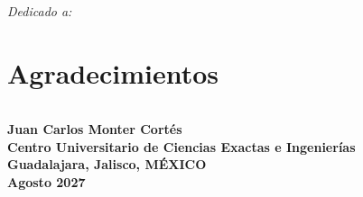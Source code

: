 \documentclass[letterpaper,12pt,oneside]{book}
\begin{document}
\chapter*{}

\vspace*{5cm}
{\Large
\textit{Dedicado a:}\\
\begin{equation*}
  \mbox{ }
\end{equation*}
}
\vspace*{\fill}

\chapter*{Agradecimientos}


\begin{equation*}
\mbox{ }
\end{equation*}

\begin{flushright}
\textbf{Juan Carlos Monter Cortés\\
Centro Universitario de Ciencias Exactas e Ingenierías\\
Guadalajara, Jalisco, MÉXICO\\
Agosto 2027}\par
\end{flushright}


\tableofcontents



%














\end{document}
